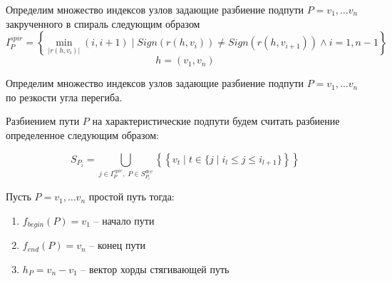 \begin{definition}
Определим множество индексов узлов задающие разбиение подпути $P = v_1, \dots v_n$ закрученного в спираль следующим образом
$$I^{spir}_P = \left\{ \min_{|r(h, v_i)|}(i, i+1)\;|\;Sign(r(h,v_i)) \neq Sign(r(h,v_{i+1})) \wedge i=1,n-1 \right\}
$$
$$
h = (v_1, v_n)
$$
\end{definition}

\begin{definition}
Определим множество индексов узлов задающие разбиение подпути $P = v_1, \dots v_n$ по резкости угла перегиба.

\end{definition}

\begin{definition}
Разбиением пути $P$ на характеристические подпути будем считать разбиение определенное следующим образом:

$$
S_{P_i} =
 	\bigcup_{ j\in I^{spir}_P,\;P\in S^{dev}_{P_i}} 
 	\left\{
 	 	\left\{
 	 		 v_t\;|\;t\in\{j\;|\;i_l\leq j\leq i_{l+1} \} 
 	 	\right\}	 
 	 \right\}
$$
\end{definition}

\begin{definition}
Пусть $P = v_1, \dots v_n$ простой путь тогда:
\begin{enumerate}
\item $f_{begin}(P) = v_1$ -- начало пути
\item $f_{end}(P) = v_n$ -- конец пути
\item $h_P = v_n - v_1$ -- вектор хорды стягивающей путь
\end{enumerate}
\end{definition}


